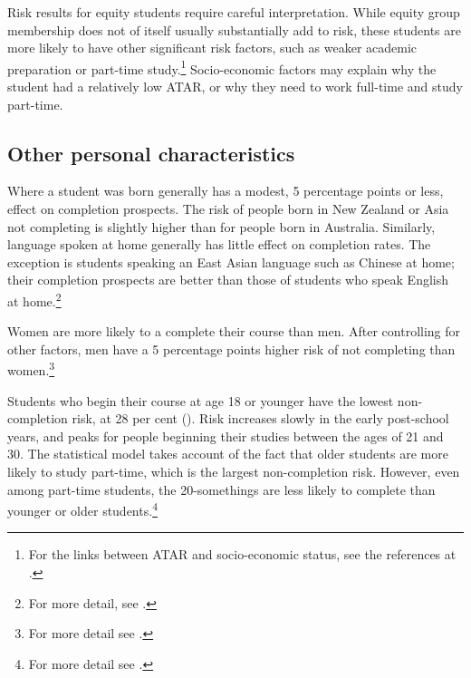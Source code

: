 Risk results for equity students require careful interpretation. While equity group membership does not of itself usually substantially add to risk, these students are more likely to have other significant risk factors, such as weaker academic preparation or part-time study.\footnote{For the links between ATAR and socio-economic status, see the references at \textcite[][186--188]{Norton2016a}.} 
Socio-economic factors may explain why the student had a relatively low ATAR, or why they need to work full-time and study part-time.

\subsection{Other personal characteristics }\label{subsec:3.1.5}

Where a student was born generally has a modest, 5 percentage points or less, effect on completion prospects. The risk of people born in New Zealand or Asia not completing is slightly higher than for people born in Australia. Similarly, language spoken at home generally has little effect on completion rates. The exception is students speaking an East Asian language such as Chinese at home; their completion prospects are better than those of students who speak English at home.\footnote{For more detail, see \textcite[][section~5.7]{Cherastidtham2018a}.}

Women are more likely to a complete their course than men. After controlling for other factors, men have a 5 percentage points higher risk of not completing than women.\footnote{For more detail see \textcite[][section~5.1]{Cherastidtham2018a}.}

Students who begin their course at age 18 or younger have the lowest non-completion risk, at 28 per cent (). Risk increases slowly in the early post-school years, and peaks for people beginning their studies between the ages of 21 and 30. The statistical model takes account of the fact that older students are more likely to study part-time, which is the largest non-completion risk. However, even among part-time students, the 20-somethings are less likely to complete than younger or older students.\footnote{For more detail see \textcite[][section~5.4]{Cherastidtham2018a}.}


